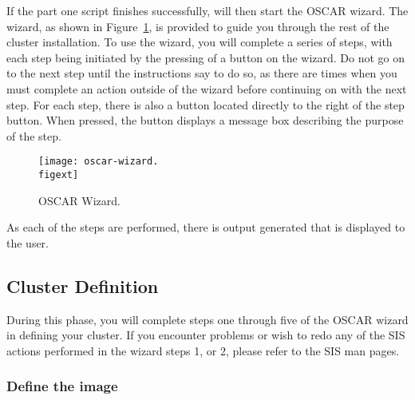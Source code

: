 If the part one script finishes successfully, 
will then start the OSCAR wizard. The wizard, as shown in
Figure~\ref{fig:detailed-oscar-wizard}, is provided to guide you
through the rest of the cluster installation.  To use the wizard, you
will complete a series of steps, with each step being initiated by the
pressing of a button on the wizard. Do not go on to the next step
until the instructions say to do so, as there are times when you must
complete an action outside of the wizard before continuing on with the
next step. For each step, there is also a  button located
directly to the right of the step button. When pressed, the
 button displays a message box describing the purpose of
the step.

\begin{figure}[htbp]
  \begin{center}
    \texttt{[image: oscar-wizard.\\figext]}
    \caption{OSCAR Wizard.}
    \label{fig:detailed-oscar-wizard}
  \end{center}
\end{figure}
  
As each of the steps are performed, there is output generated that is
displayed to the user. 


\subsection{Cluster Definition}
\label{sec:detailed-cluster-def}

During this phase, you will complete steps one through five of the
OSCAR wizard in defining your cluster. If you encounter problems or
wish to redo any of the SIS actions performed in the wizard steps 1,
or 2, please refer to the SIS man pages.

\subsubsection{Define the image} 

